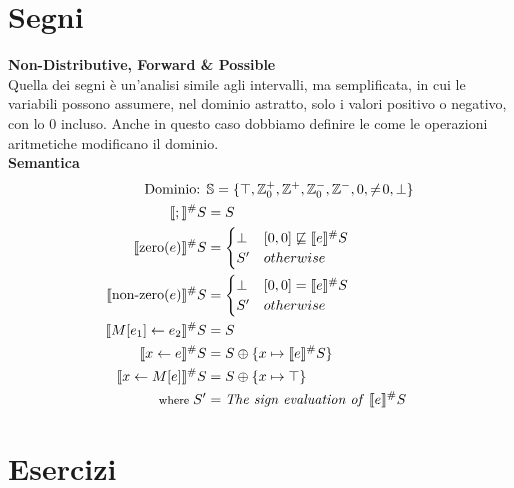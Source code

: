 \documentclass[a4paper,12pt,openany]{article}
\begin{document}
    \clearpage\section*{Segni}
    \textbf{Non-Distributive, Forward \& Possible}\\[1em]
    Quella dei segni è un'analisi simile agli intervalli, ma semplificata, in cui le variabili possono assumere, nel dominio astratto, solo i valori positivo o negativo, con lo 0 incluso. Anche in questo caso dobbiamo definire le come le operazioni aritmetiche modificano il dominio.\\[1em]
    
    \textbf{Semantica}
    \begin{align*}
    \mbox{Dominio: }& \mathbb{S}=\{ \top, \mathbb{Z}_0^+, \mathbb{Z}^+, \mathbb{Z}_0^-, \mathbb{Z}^-, 0, \neq\!0, \bot \}\\
    \llbracket ; \rrbracket^\#S &= S\\
    \llbracket \mbox{zero}(e) \rrbracket^\#S &= 
    \begin{cases}
    \bot & [0, 0] \not\sqsubseteq \llbracket e \rrbracket^\#S\\
    S' & otherwise
    \end{cases}\\
    \llbracket \mbox{non-zero}(e) \rrbracket^\#S &= 
    \begin{cases}
    \bot & [0, 0] = \llbracket e \rrbracket^\#S\\
    S' & otherwise
    \end{cases}\\
    \llbracket M[e_1]\leftarrow e_2 \rrbracket^\#S &= S\\
    \llbracket x \leftarrow e \rrbracket^\#S &= S\oplus \{x\mapsto\llbracket e \rrbracket^\#S\}\\
    \llbracket x \leftarrow M[e] \rrbracket^\#S &= S\oplus \{x\mapsto\top\}\\
    \mbox{\footnotesize where } S' &= \mbox{\textit{The sign evaluation of} } \llbracket e \rrbracket^\#S
    \end{align*}


    \newpage
    \clearpage\section*{Esercizi}
\end{document}
